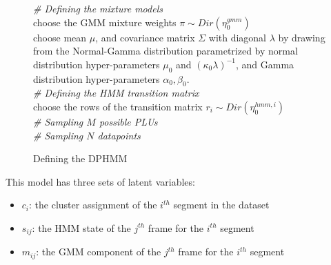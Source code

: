 \documentclass[12pt,letterpaper]{article}
\begin{document}
\begin{figure}[h]
\begin{algorithm}[H]
\emph{\# Defining the mixture models\\}
choose the GMM mixture weights $\pi \sim Dir(\eta_0^{gmm})$\\
choose mean $\mu$, and covariance matrix $\Sigma$ with diagonal $\lambda$ by drawing from the Normal-Gamma distribution parametrized by normal distribution hyper-parameters $\mu_0$ and $(\kappa_0\lambda)^{-1}$, and Gamma distribution hyper-parameters $\alpha_0, \beta_0$. \\

\emph{\# Defining the HMM transition matrix\\}
choose the rows of the transition matrix $r_i \sim Dir(\eta_0^{hmm,i})$\\

\emph{\# Sampling $M$ possible PLUs\\}
\emph{\# Sampling $N$ datapoints\\}
\caption{Defining the DPHMM}
\label{dphmm-algo}
\end{algorithm}

\end{figure}
This model has three sets of latent variables: 
\begin{itemize}
\item $c_i$: the cluster assignment of the $i^{th}$ segment in the dataset
\item $s_{ij}$: the HMM state of the $j^{th}$ frame for the $i^{th}$ segment
\item $m_{ij}$: the GMM component of the $j^{th}$ frame for the $i^{th}$ segment
\end{itemize}
\end{document}
